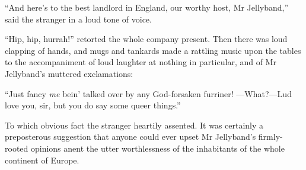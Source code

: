 \enquote{And here's to the best landlord in England, our worthy host, Mr Jellyband,} said the stranger in a loud tone of voice.

\enquote{Hip, hip, hurrah!} retorted the whole company present. Then there was loud clapping of hands, and mugs and tankards made a rattling music upon the tables to the accompaniment of loud laughter at nothing in particular, and of Mr Jellyband's muttered exclamations:

\enquote{Just fancy \textit{me} bein’ talked over by any God-forsaken furriner! ---What?---Lud love you, sir, but you do say some queer things.}

To which obvious fact the stranger heartily assented. It was certainly a preposterous suggestion that anyone could ever upset Mr Jellyband's firmly-rooted opinions anent the utter worthlessness of the inhabitants of the whole continent of Europe.